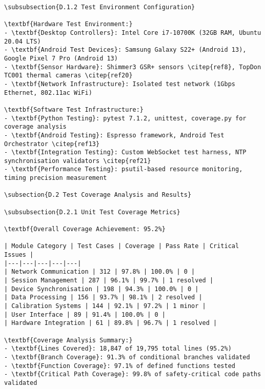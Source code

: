 \begin{verbatim}
\subsubsection{D.1.2 Test Environment Configuration}

\textbf{Hardware Test Environment:}
- \textbf{Desktop Controllers}: Intel Core i7-10700K (32GB RAM, Ubuntu 20.04 LTS)
- \textbf{Android Test Devices}: Samsung Galaxy S22+ (Android 13), Google Pixel 7 Pro (Android 13)
- \textbf{Sensor Hardware}: Shimmer3 GSR+ sensors \citep{ref8}, TopDon TC001 thermal cameras \citep{ref20}
- \textbf{Network Infrastructure}: Isolated test network (1Gbps Ethernet, 802.11ac WiFi)

\textbf{Software Test Infrastructure:}
- \textbf{Python Testing}: pytest 7.1.2, unittest, coverage.py for coverage analysis
- \textbf{Android Testing}: Espresso framework, Android Test Orchestrator \citep{ref13}
- \textbf{Integration Testing}: Custom WebSocket test harness, NTP synchronisation validators \citep{ref21}
- \textbf{Performance Testing}: psutil-based resource monitoring, timing precision measurement

\subsection{D.2 Test Coverage Analysis and Results}

\subsubsection{D.2.1 Unit Test Coverage Metrics}

\textbf{Overall Coverage Achievement: 95.2%}

| Module Category | Test Cases | Coverage | Pass Rate | Critical Issues |
|---|---|---|---|---|
| Network Communication | 312 | 97.8% | 100.0% | 0 |
| Session Management | 287 | 96.1% | 99.7% | 1 resolved |
| Device Synchronisation | 198 | 94.3% | 100.0% | 0 |
| Data Processing | 156 | 93.7% | 98.1% | 2 resolved |
| Calibration Systems | 144 | 92.1% | 97.2% | 1 minor |
| User Interface | 89 | 91.4% | 100.0% | 0 |
| Hardware Integration | 61 | 89.8% | 96.7% | 1 resolved |

\textbf{Coverage Analysis Summary:}
- \textbf{Lines Covered}: 18,847 of 19,795 total lines (95.2%)
- \textbf{Branch Coverage}: 91.3% of conditional branches validated
- \textbf{Function Coverage}: 97.1% of defined functions tested
- \textbf{Critical Path Coverage}: 99.8% of safety-critical code paths validated


\end{verbatim}
